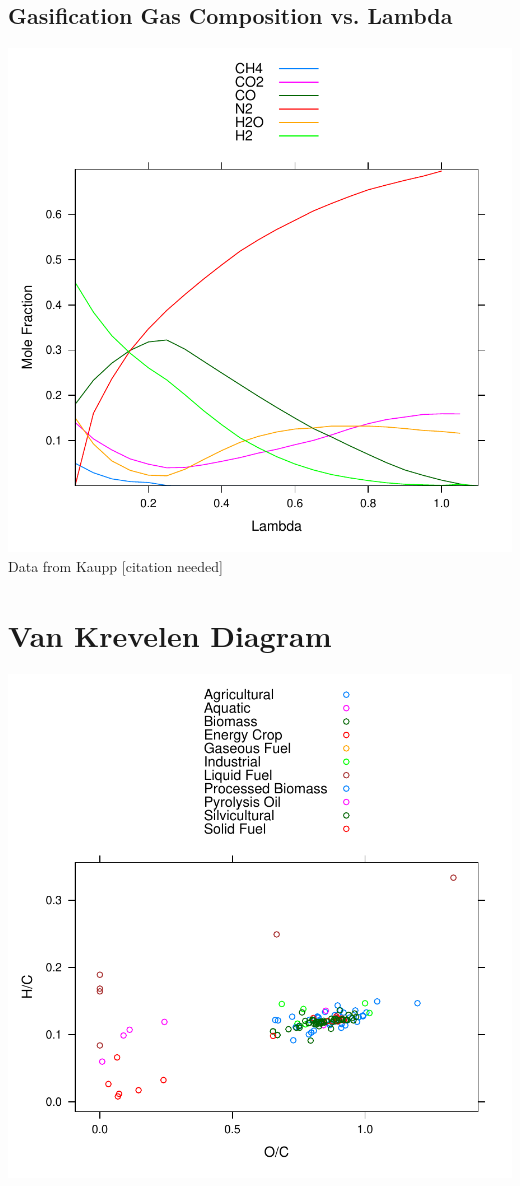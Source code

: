 \documentclass[a4paper]{article}
\begin{document}
\subsection{Gasification Gas Composition vs. Lambda}
\includegraphics{documentation/images/img-001}
\\
Data from Kaupp [citation needed]
\\
\section{Van Krevelen Diagram}
\includegraphics{documentation/images/img-002}
\\
\end{document}
